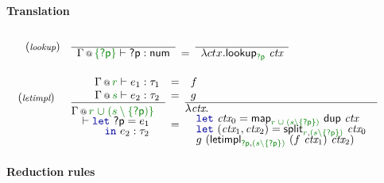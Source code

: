 \begin{figure}[h!]
\vspace{1em}
\paragraph{Translation}

\begin{equation*}
\begin{array}{rl}  
(\footnotesize{\emph{lookup}}) &
\semdef
  { \coctx{\Gamma}{\cclrd{ \{\ident{?p}\} }} \vdash \ident{?p} : \ident{num} }
  {\lambda ctx.\ident{lookup}_{\cclrd{\ident{?p}}}~\ctx }
\\[2em]
\begin{array}{l}(\footnotesize{\emph{letimpl}})\\[1.25em]~\end{array}&
\semdefff
  { \coctx{\Gamma}{\cclrd{r}} \vdash e_1 : \tau_1}
  { \coctx{\Gamma}{\cclrd{s}} \vdash e_2 : \tau_2}
  {\hspace{-1em}\begin{array}{l}  
      \coctx{\Gamma}{\cclrd{r} \;\cclrd{\cup\; (\cclrd{s} \setminus \{ \ident{?p}) \}} }\\[-0.3em]
        \quad \vdash \kvd{let}~\ident{?p}=e_1\\[-0.3em]
        \quad\qquad \kvd{in}~e_2 : \tau_2 \\[-0.3em]
        ~ \\[-0.3em]
   \end{array}}
  {f}
  {g}
  {\hspace{-1em}\begin{array}{l}  
  \lambda\ctx.~~\\[-0.3em]
    \quad \kvd{let}~\ctx_0 = \ident{map}_{\cclrd{r} \;\cclrd{\cup}\; \cclrd{(s\setminus\{\ident{?p}\})}}~\ident{dup}~\ctx\\[-0.3em]
    \quad \kvd{let}~(\ctx_1, \ctx_2) = \ident{split}_{\cclrd{r}, \cclrd{(s\setminus\{\ident{?p}\})}}~\ctx_0\\[-0.3em]
    \quad g~(\ident{letimpl}_{\cclrd{\ident{?p}}, \cclrd{(s\setminus\{\ident{?p}\})}}~(f~\ctx_1)~\ctx_2)
  \end{array} }   
\end{array}
\end{equation*}

\vspace{1em}
\paragraph{Reduction rules}


\end{figure}
